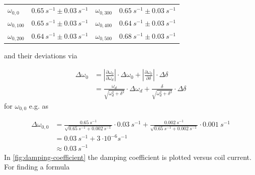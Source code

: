             \begin{table}[h]
                \centering
                \caption[Angular natural frequencies]{}
                \begin{tabular}{@{}llll@{}}
                    \toprule
                    $\omega_{0,0}$      &$\SI{0.65}{s^{-1}} \pm \SI{0.03}{s^{-1}}$  &\hspace{10mm}$\omega_{0,300}$   &$\SI{0.65}{s^{-1}} \pm \SI{0.03}{s^{-1}}$\\
                    $\omega_{0,100}$    &$\SI{0.65}{s^{-1}} \pm \SI{0.03}{s^{-1}}$  &\hspace{10mm}$\omega_{0,400}$   &$\SI{0.64}{s^{-1}} \pm \SI{0.03}{s^{-1}}$\\
                    $\omega_{0,200}$    &$\SI{0.64}{s^{-1}} \pm \SI{0.03}{s^{-1}}$  &\hspace{10mm}$\omega_{0,500}$   &$\SI{0.68}{s^{-1}} \pm \SI{0.03}{s^{-1}}$\\
                    \bottomrule
                \end{tabular}
                \label{tab:angular_natural_frequencies}
            \end{table}
            and their deviations via\par
            \begin{align}
                \Delta\omega_0  &=\left| \frac{\partial\omega_0}{\partial\omega_d} \right| \cdot \Delta\omega_0 + \left| \frac{\partial\omega_0}{\partial\delta} \right| \cdot \Delta\delta \nonumber\\
                                &=\frac{\omega_d}{\sqrt{\omega_d^2+\delta^2}} \cdot \Delta\omega_d + \frac{\delta}{\sqrt{\omega_d^2+\delta^2}} \cdot \Delta\delta
            \end{align}
            for $ \omega_{0,0} $ e.g. as\par
            \begin{align*}
                \Delta\omega_{0,0}  &=\frac{\SI{0.65}{s^{-1}}}{\sqrt{\SI{0.65}{s^{-1}}+\SI{0.002}{s^{-1}}}} \cdot \SI{0.03}{s^{-1}} + \frac{\SI{0.002}{s^{-1}}}{\sqrt{\SI{0.65}{s^{-1}}+\SI{0.002}{s^{-1}}}} \cdot \SI{0.001}{s^{-1}}\\
                                    &=\SI{0.03}{s^{-1}}+\SI{3}{\cdot10^{-6}s^{-1}}\\
                                    &\approx\SI{0.03}{s^{-1}}
            \end{align*}
            In \cref{fig:damping-coefficient} the damping coefficient is plotted versus coil current. For finding a formula
